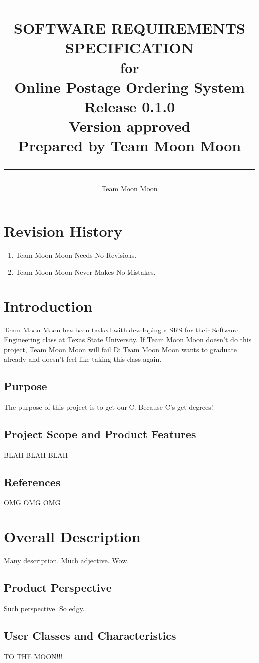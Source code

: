 \documentclass{scrreprt}
\title{%
\flushright
\rule{16cm}{5pt}\vskip1cm
\Huge{SOFTWARE REQUIREMENTS\\ SPECIFICATION}\\
\vspace{2cm}
for\\
\vspace{2cm}
Online Postage Ordering System\\
\vspace{2cm}
\LARGE{Release 0.1.0\\}
\vspace{2cm}
\LARGE{Version \myversion approved\\}
\vspace{2cm}
Prepared by Team Moon Moon\\
\vfill
\rule{16cm}{5pt}
}
\date{}
\author{Team Moon Moon}
\begin{document}
\maketitle
\tableofcontents

\chapter*{Revision History}

\begin{enumerate}
\item Team Moon Moon Needs No Revisions.
\item Team Moon Moon Never Makes No Mistakes.
\end{enumerate}

\chapter{Introduction}

Team Moon Moon has been tasked with developing a SRS for their Software 
Engineering class at Texas State University. If Team Moon Moon doesn't do 
this project, Team Moon Moon will fail D: Team Moon Moon wants to 
graduate already and doesn't feel like taking this class again.

\section{Purpose}

The purpose of this project is to get our C. Because C's get degrees!

\section{Project Scope and Product Features}

BLAH BLAH BLAH

\section{References}

OMG OMG OMG

\chapter{Overall Description}

Many description. Much adjective. Wow.

\section{Product Perspective}

Such perspective. So edgy.

\section{User Classes and Characteristics}

TO THE MOON!!!

\end{document}
